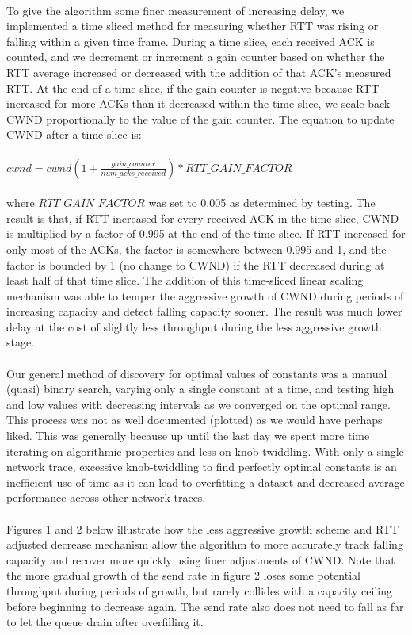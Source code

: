 \documentclass[12pt]{article}
\begin{document}
\\
To give the algorithm some finer measurement of increasing delay, we implemented a time sliced method for measuring whether RTT was rising or falling within a given time frame. During a time slice, each received ACK is counted, and we decrement or increment a gain counter based on whether the RTT average increased or decreased with the addition of that ACK's measured RTT. At the end of a time slice, if the gain counter is negative because RTT increased for more ACKs than it decreased within the time slice, we scale back CWND proportionally to the value of the gain counter. The equation to update CWND after a time slice is:\\
\\
$cwnd = cwnd (1 + \frac{gain\_counter}{num\_acks\_received}) * RTT\_GAIN\_FACTOR$\\
\\
where $RTT\_GAIN\_FACTOR$ was set to 0.005 as determined by testing. The result is that, if RTT increased for every received ACK in the time slice, CWND is multiplied by a factor of 0.995 at the end of the time slice. If RTT increased for only most of the ACKs, the factor is somewhere between 0.995 and 1, and the factor is bounded by 1 (no change to CWND) if the RTT decreased during at least half of that time slice. The addition of this time-sliced linear scaling mechanism was able to temper the aggressive growth of CWND during periods of increasing capacity and detect falling capacity sooner. The result was much lower delay at the cost of slightly less throughput during the less aggressive growth stage.\\
\\
Our general method of discovery for optimal values of constants was a manual (quasi) binary search, varying only a single constant at a time, and testing high and low values with decreasing intervals as we converged on the optimal range. This process was not as well documented (plotted) as we would have perhaps liked. This was generally because up until the last day we spent more time iterating on algorithmic properties and less on knob-twiddling. With only a single network trace, excessive knob-twiddling to find perfectly optimal constants is an inefficient use of time as it can lead to overfitting a dataset and decreased average performance across other network traces. \\
\\
Figures 1 and 2 below illustrate how the less aggressive growth scheme and RTT adjusted decrease mechanism allow the algorithm to more accurately track falling capacity and recover more quickly using finer adjustments of CWND. Note that the more gradual growth of the send rate in figure 2 loses some potential throughput during periods of growth, but rarely collides with a capacity ceiling before beginning to decrease again. The send rate also does not need to fall as far to let the queue drain after overfilling it.\\
\end{document}
